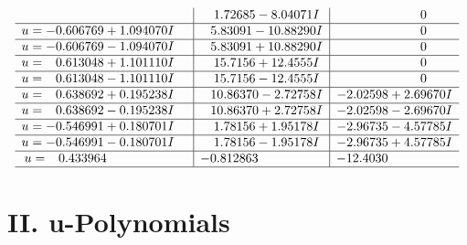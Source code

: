 \documentclass[1p]{elsarticle_modified}
\theoremstyle{definition}
\begin{document}
$$\begin{array}{c|c|c}
 & \phantom{-}1.72685 - 8.04071 I & \phantom{-0.000000 } 0 \\ \hline\begin{aligned}
u &= -0.606769 + 1.094070 I\end{aligned}
 & \phantom{-}5.83091 - 10.88290 I & \phantom{-0.000000 } 0 \\ \hline\begin{aligned}
u &= -0.606769 - 1.094070 I\end{aligned}
 & \phantom{-}5.83091 + 10.88290 I & \phantom{-0.000000 } 0 \\ \hline\begin{aligned}
u &= \phantom{-}0.613048 + 1.101110 I\end{aligned}
 & \phantom{-}15.7156 + 12.4555 I & \phantom{-0.000000 } 0 \\ \hline\begin{aligned}
u &= \phantom{-}0.613048 - 1.101110 I\end{aligned}
 & \phantom{-}15.7156 - 12.4555 I & \phantom{-0.000000 } 0 \\ \hline\begin{aligned}
u &= \phantom{-}0.638692 + 0.195238 I\end{aligned}
 & \phantom{-}10.86370 - 2.72758 I & -2.02598 + 2.69670 I \\ \hline\begin{aligned}
u &= \phantom{-}0.638692 - 0.195238 I\end{aligned}
 & \phantom{-}10.86370 + 2.72758 I & -2.02598 - 2.69670 I \\ \hline\begin{aligned}
u &= -0.546991 + 0.180701 I\end{aligned}
 & \phantom{-}1.78156 + 1.95178 I & -2.96735 - 4.57785 I \\ \hline\begin{aligned}
u &= -0.546991 - 0.180701 I\end{aligned}
 & \phantom{-}1.78156 - 1.95178 I & -2.96735 + 4.57785 I \\ \hline\begin{aligned}
u &= \phantom{-}0.433964\phantom{ +0.000000I}\end{aligned}
 & -0.812863\phantom{ +0.000000I} & -12.4030\phantom{ +0.000000I}\\
 \hline 
 \end{array}$$\newpage
\newpage\renewcommand{\arraystretch}{1}
\centering \section*{ II. u-Polynomials}
\end{document}

